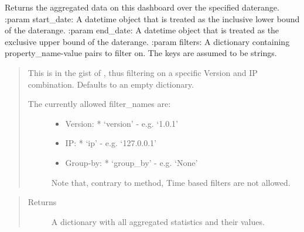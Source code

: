 \documentclass[letterpaper,10pt,english]{sphinxmanual}
\begin{document}
\begin{fulllineitems}
\begin{fulllineitems}
\begin{quote}
\begin{description}
\end{description}\end{quote}

\end{fulllineitems}


\begin{fulllineitems}
\label{\detokenize{pydash_app.dashboard.entity:pydash_app.dashboard.entity.Dashboard.aggregated_data_daterange}}
Returns the aggregated data on this dashboard over the specified daterange.
:param start\_date: A datetime object that is treated as the inclusive lower bound of the daterange.
:param end\_date: A datetime object that is treated as the exclusive upper bound of the daterange.
:param filters: A dictionary containing property\_name-value pairs to filter on. The keys are assumed to be strings.
\begin{quote}

This is in the gist of , thus filtering on a specific Version and IP combination.
Defaults to an empty dictionary.
\begin{description}
\item[{The currently allowed filter\_names are:}] \leavevmode\begin{itemize}
\item {} 
Version:
* ‘version’ - e.g. ‘1.0.1’

\item {} 
IP:
* ‘ip’ - e.g. ‘127.0.0.1’

\item {} 
Group-by:
* ‘group\_by’ - e.g. ‘None’

\end{itemize}

Note that, contrary to  method, Time based filters are not allowed.

\end{description}
\end{quote}
\begin{quote}\begin{description}
\item[{Returns}] \leavevmode
A dictionary with all aggregated statistics and their values.

\end{description}\end{quote}


\end{fulllineitems}
\end{fulllineitems}
\end{document}
